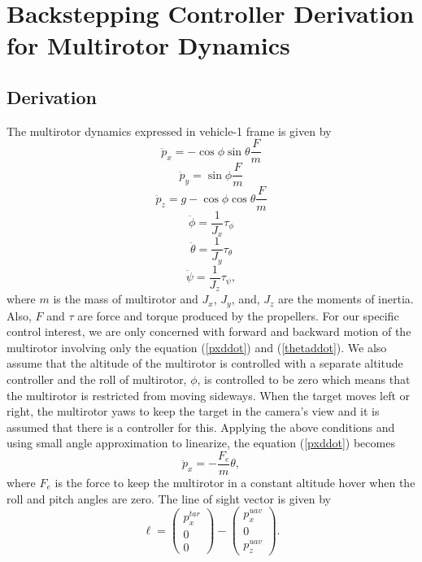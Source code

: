 \section{Backstepping Controller Derivation for Multirotor Dynamics}
\subsection{Derivation}
The multirotor dynamics expressed in vehicle-1 frame \cite{Beard2008} is given by 
\begin{equation}
\ddot{p}_x=-\cos\phi\sin\theta\frac{F}{m}
\label{pxddot}
\end{equation}
\begin{equation}
\ddot{p}_y=\sin\phi\frac{F}{m}
\end{equation}
\begin{equation}
\ddot{p}_z=g-\cos\phi\cos\theta\frac{F}{m}
\end{equation}
\begin{equation}
\ddot{\phi}=\frac{1}{J_x}\tau_{\phi}
\end{equation}
\begin{equation}
\ddot{\theta}=\frac{1}{J_y}\tau_{\theta}
\label{thetaddot}
\end{equation}
\begin{equation}
\ddot{\psi}=\frac{1}{J_z}\tau_{\psi},
\end{equation}
where $m$ is the mass of multirotor and $J_x$, $J_y$, and, $J_z$ are the moments of inertia. Also, $F$ and $\tau$ are force and torque produced by the propellers. For our specific control interest, we are only concerned with forward and backward motion of the multirotor involving only the equation (\ref{pxddot}) and (\ref{thetaddot}). We also assume that the altitude of the multirotor is controlled with a separate altitude controller and the roll of multirotor, $\phi$, is controlled to be zero which means that the multirotor is restricted from moving sideways. When the target moves left or right, the multirotor yaws to keep the target in the camera's view and it is assumed that there is a controller for this. Applying the above conditions and using small angle approximation to linearize, the equation (\ref{pxddot}) becomes 
\begin{equation}
\ddot{p}_x=-\frac{F_e}{m}\theta,
\end{equation}
where $F_e$ is the force to keep the multirotor in a constant altitude hover when the roll and pitch angles are zero. The line of sight vector is given by 
\begin{equation}
\ell=\begin{pmatrix}
p_x^{tar} \\ 0 \\ 0
\end{pmatrix}
-\begin{pmatrix}
p_x^{uav} \\ 0 \\ p_z^{uav}
\end{pmatrix}.
\label{l}
\end{equation}
